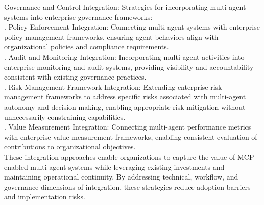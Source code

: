 Governance and Control Integration: Strategies for incorporating multi-agent systems into enterprise governance frameworks:\\ . Policy Enforcement Integration: Connecting multi-agent systems with enterprise policy management frameworks, ensuring agent behaviors align with organizational policies and compliance requirements.\\ . Audit and Monitoring Integration: Incorporating multi-agent activities into enterprise monitoring and audit systems, providing visibility and accountability consistent with existing governance practices.\\ . Risk Management Framework Integration: Extending enterprise risk management frameworks to address specific risks associated with multi-agent autonomy and decision-making, enabling appropriate risk mitigation without unnecessarily constraining capabilities.\\ . Value Measurement Integration: Connecting multi-agent performance metrics with enterprise value measurement frameworks, enabling consistent evaluation of contributions to organizational objectives.\\ \newline
These integration approaches enable organizations to capture the value of MCP-enabled multi-agent systems while leveraging existing investments and maintaining operational continuity. By addressing technical, workflow, and governance dimensions of integration, these strategies reduce adoption barriers and implementation risks.\\
